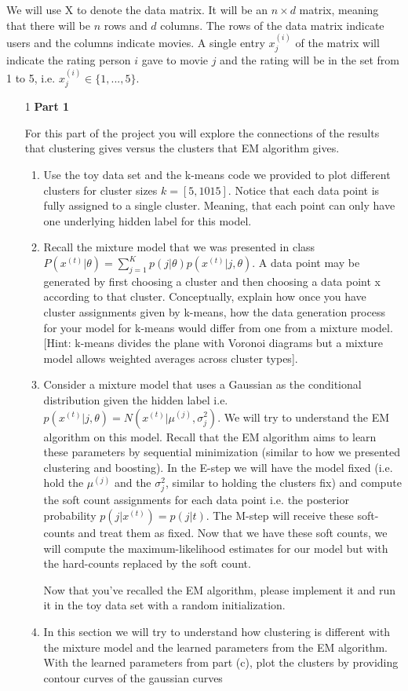 We will use X to denote the data matrix. It will be an $n \times d$ matrix, meaning that there will be $n$ rows and $d$ columns. The rows of the data matrix indicate users and the columns indicate movies. A single entry $x^{(i)}_{j}$ of the matrix will indicate the rating person $i$ gave to movie $j$ and the rating will be in the set from 1 to 5, i.e. $x^{(i)}_{j} \in \{ 1, ..., 5\}$.
\begin{enumerate}

\item[1] {\bf Part 1}

For this part of the project you will explore the connections of the results that clustering gives versus the clusters that EM algorithm gives.

\begin{enumerate}
  \item Use the toy data set and the k-means code we provided to plot different clusters for cluster sizes $k = [5, 10 15]$. Notice that each data point is fully assigned to a single cluster. Meaning, that each point can only have one underlying hidden label for this model.
  \item Recall the mixture model that we was presented in class $P(x^{(t)} | \theta) = \sum^{K}_{j=1} p(j| \theta)p(x^{(t)} | j, \theta) $. A data point may be generated by first choosing a cluster and then choosing a data point x according to that cluster. Conceptually, explain how once you have cluster assignments given by k-means, how the data generation process for your model for k-means would differ from one from a mixture model. [Hint: k-means divides the plane with Voronoi diagrams but a mixture model allows weighted averages across cluster types].
  \item Consider a mixture model that uses a Gaussian as the conditional distribution given the hidden label i.e. $p(x^{(t)} | j, \theta) = N(x^{(t)}| \mu^{(j)}, \sigma^2_{j})$.  We will try to understand the EM algorithm on this model. 
 Recall that the EM algorithm aims to learn these parameters by sequential minimization (similar to how we presented clustering and boosting). 
In the E-step we will have the model fixed (i.e. hold the $ \mu^{(j)}$ and the $\sigma^2_{j}$, similar to holding the clusters fix) and compute the soft count assignments for each data point i.e. the posterior probability $p(j | x^{(t)}) = p(j|t)$. The M-step will receive these soft-counts and treat them as fixed. Now that we have these soft counts, we will compute the maximum-likelihood estimates for our model but with the hard-counts replaced by the soft count. 

Now that you've recalled the EM algorithm, please implement it and run it in the toy data set with a random initialization. 

\item In this section we will try to understand how clustering is different with the mixture model and the learned parameters from the EM algorithm. With the learned parameters from part (c), plot the clusters by providing contour curves of the gaussian curves 
\end{enumerate}

\end{enumerate}





